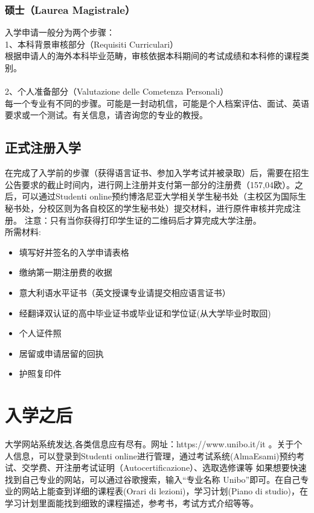 \subsubsection{硕士（Laurea Magistrale）}
入学申请一般分为两个步骤：\\
1、本科背景审核部分（Requisiti Curriculari）\\ 
根据申请人的海外本科毕业范畴，审核依据本科期间的考试成绩和本科修的课程类别。\\
\\
2、个人准备部分（Valutazione delle Cometenza Personali）\\
每一个专业有不同的步骤。可能是一封动机信，可能是个人档案评估、面试、英语要求或一个测试。有关信息，请咨询您的专业的教授。


\subsection{正式注册入学}
在完成了入学前的步骤（获得语言证书、参加入学考试并被录取）后，需要在招生公告要求的截止时间内，进行网上注册并支付第一部分的注册费（157,04欧）。之后，可以通过Studenti online预约博洛尼亚大学相关学生秘书处（主校区为国际生秘书处，分校区则为各自校区的学生秘书处）提交材料，进行原件审核并完成注册。
注意：只有当你获得打印学生证的二维码后才算完成大学注册。
\\

所需材料:
\begin{itemize}
\item 填写好并签名的入学申请表格 
\item 缴纳第一期注册费的收据
\item 意大利语水平证书（英文授课专业请提交相应语言证书）
\item 经翻译双认证的高中毕业证书或毕业证和学位证(从大学毕业时取回)
\item 个人证件照
\item 居留或申请居留的回执
\item 护照复印件
\end{itemize}


\section{入学之后}
大学网站系统发达,各类信息应有尽有。网址：https://www.unibo.it/it 。关于个人信息，可以登录到Studenti online进行管理，通过考试系统(AlmaEsami)预约考试、交学费、开注册考试证明（Autocertificazione）、选取选修课等
如果想要快速找到自己专业的网站，可以通过谷歌搜索，输入“专业名称 Unibo”即可。在自己专业的网站上能查到详细的课程表(Orari di lezioni)，学习计划(Piano di studio)，在学习计划里面能找到细致的课程描述，参考书，考试方式介绍等等。

